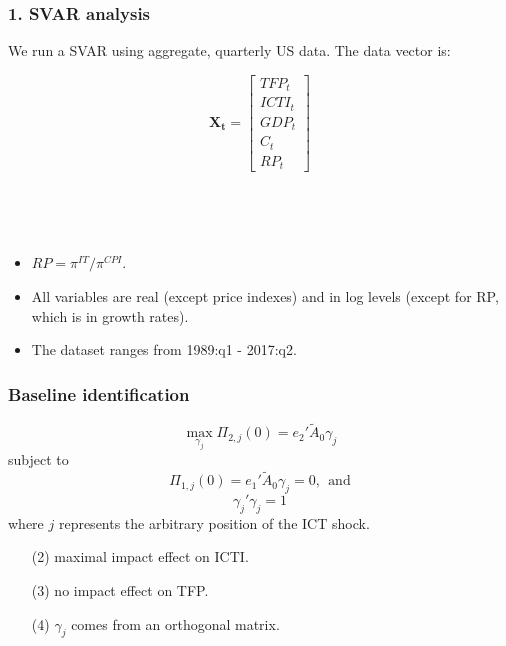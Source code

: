 \documentclass{beamer}
\begin{document}
\begin{frame}
	\frametitle{1. SVAR analysis}

	We run a SVAR using aggregate, quarterly US data. The data vector is:
	
	\begin{equation}
	\mathbf{X_t} = 
	\begin{bmatrix}
    TFP_t      \\
 
   ICTI_t   \\
      
   GDP_t \\
   
   C_t \\
   
   RP_t
\end{bmatrix}
	\end{equation}
	


\

\

\begin{itemize}
\item $RP = \pi^{IT}/\pi^{CPI}$. 
\item All variables are real (except price indexes) and in log levels (except for RP, which is in growth rates). 
\item The dataset ranges from 1989:q1 - 2017:q2.
\end{itemize}	
	
\end{frame}

\begin{frame}
	\frametitle{Baseline identification}
	\label{baseline_spec}
	
\begin{equation}\label{eq:mainObjective}
\max_{\gamma_j} \Pi_{2,j}(0) = e_2' \tilde{A}_0 \gamma_j
\end{equation}
subject to
\begin{equation}\label{eq:mainZeroTFP}
\Pi_{1,j}(0) = e_1' \tilde{A}_0 \gamma_j = 0, \ \ \text{and}
\end{equation}
\begin{equation}\label{eq:mainOrtho}
\gamma_j' \gamma_j = 1
\end{equation}
where $j$ represents the arbitrary position of the ICT shock.

	
	\begin{itemize}
	 \item[(2)] maximal impact effect on ICTI. 
	 \item[(3)] no impact effect on TFP. 
	 \item[(4)]$\gamma_j$ comes from an orthogonal matrix.
	
	
	\end{itemize}

\hyperlink{VAR_notation}{}	

\end{frame}
\end{document}
